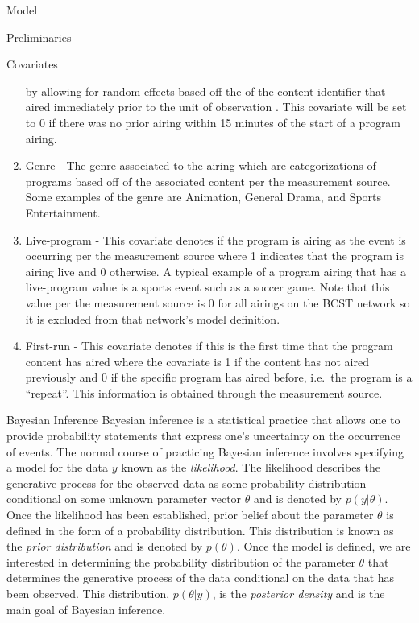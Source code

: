\begin{chapter}{Model}
\begin{section}{Preliminaries}
\begin{subsection}{Covariates}
\begin{enumerate}
      by allowing for random effects based off the of the content identifier that aired immediately prior to the unit of observation \cite{tvforecasting}.
      This covariate will be set to 0 if there was no prior airing within 15 minutes of the start of a program airing.
    \item Genre - The genre associated to the airing which are categorizations
      of programs based off of the associated content per the measurement source.
      Some examples of the genre are Animation, General Drama, and Sports Entertainment.
    \item Live-program - This covariate denotes if the program is airing as the event is occurring per the measurement source
      where 1 indicates that the program is airing live and 0 otherwise.
      A typical example of a program airing that has a live-program value is a sports event such as a soccer game.
      Note that this value per the measurement source is 0 for all airings on the BCST network so it is excluded from
      that network's model definition.
    \item First-run - This covariate denotes if this is the first time that the program content has aired where the covariate
      is 1 if the content has not aired previously and 0 if the specific program has aired before, i.e.\ the program is a ``repeat''.
      This information is obtained through the measurement source.
    \end{enumerate}
  \end{subsection}

  \begin{subsection}{Bayesian Inference}
    Bayesian inference is a statistical practice that allows one to provide probability
    statements that express one's uncertainty on the occurrence of events.
    The normal course of practicing Bayesian inference involves specifying a model for the data $y$ known
    as the \emph{likelihood}. The likelihood describes the generative process for the observed data
    as some probability distribution conditional on some unknown parameter vector $\theta$ and is denoted
    by $p(y | \theta)$. Once the likelihood has been established, prior belief about the parameter $\theta$
    is defined in the form of a probability distribution. This distribution is known as the
    \emph{prior distribution} and is denoted by $p(\theta)$. Once the model is defined,
    we are interested in determining the probability distribution of the parameter $\theta$
    that determines the generative process of the data
    conditional on the data that has been observed. This distribution, $p(\theta | y)$,
    is the \emph{posterior density} and is the main goal of Bayesian inference.


\end{subsection}
\end{section}
\end{chapter}
